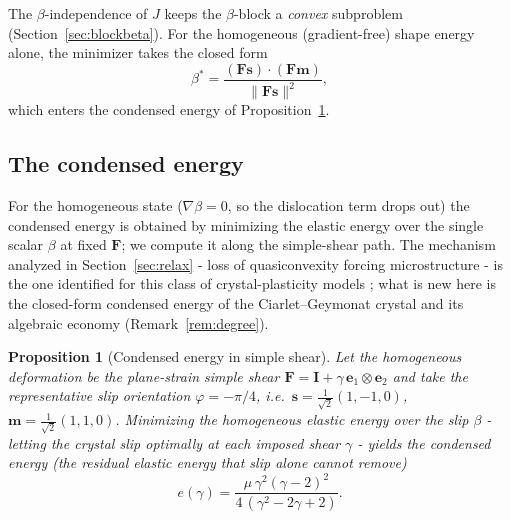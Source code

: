 \documentclass[12pt]{article}
\theoremstyle{plain}
\newtheorem{proposition}[theorem]{Proposition}
\theoremstyle{definition}
\newcommand{\bF}{\bm{F}}
\newcommand{\bs}{\bm{s}}
\newcommand{\bmm}{\bm{m}}
\newcommand{\bI}{\bm{I}}
\begin{document}
\noindent The $\beta$-independence of $J$ keeps the $\beta$-block a
\emph{convex} subproblem (Section~\ref{sec:blockbeta}). For the homogeneous
(gradient-free) shape energy alone, the minimizer takes the closed form
\begin{equation*}
  \beta^{\ast}=\frac{(\bF\bs)\cdot(\bF\bmm)}{\|\bF\bs\|^{2}},
\end{equation*}
which enters the condensed energy of Proposition~\ref{prop:condensed}.

\subsection{The condensed energy}\label{sec:condensed}
For the homogeneous state ($\nabla\beta=0$, so the dislocation term drops out) the
condensed energy is obtained by minimizing the elastic energy over the single
scalar $\beta$ at fixed $\bF$; we compute it along the simple-shear path. The
mechanism analyzed in Section~\ref{sec:relax} - loss of quasiconvexity forcing
microstructure - is the one identified for this class of crystal-plasticity models
\citep{koster2015aformation}; what is new here is the closed-form
condensed energy of the Ciarlet--Geymonat crystal and its algebraic economy
(Remark~\ref{rem:degree}).

\begin{proposition}[Condensed energy in simple shear]\label{prop:condensed}
Let the homogeneous deformation be the plane-strain simple shear
$\bF=\bI+\gamma\,\bm{e}_1\otimes\bm{e}_2$ and take the representative slip
orientation $\varphi=-\pi/4$, i.e.\
$\bs=\tfrac1{\sqrt2}(1,-1,0)$, $\bmm=\tfrac1{\sqrt2}(1,1,0)$. Minimizing the
homogeneous elastic energy over the slip $\beta$ - letting the crystal slip
optimally at each imposed shear $\gamma$ - yields the \emph{condensed energy}
(the residual elastic energy that slip alone cannot remove)
\begin{equation}\label{eq:condensed}
  e(\gamma)=\frac{\mu\,\gamma^{2}(\gamma-2)^{2}}{4\,(\gamma^{2}-2\gamma+2)} .
\end{equation}
\end{proposition}
\end{document}
